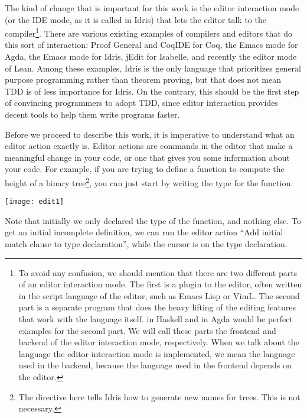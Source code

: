 The kind of change that is important for this work is the editor
interaction mode (or the IDE mode, as it is called in Idris\cite{idris}) that
lets the editor talk to the compiler\footnote{To avoid any confusion,
we should mention that there are two different parts of an editor interaction
mode. The first is a plugin to the editor, often written in the script language
of the editor, such as Emacs Lisp or VimL. The second part is a separate
program that does the heavy lifting of the editing features that work with the
language itself.   in Haskell and  in Agda would
be perfect examples for the second part. We will call these parts the frontend
and backend of the editor interaction mode, respectively.  When we talk about
the language the editor interaction mode is implemented, we mean the language
used in the backend, because the language used in the frontend depends on the
editor.}.
There are various existing examples of compilers and editors
that do this sort of interaction:
Proof General\cite{pg} and CoqIDE for Coq\cite{coq},
the Emacs mode\cite{agdamode} for Agda,
the Emacs mode\cite{idrismode} for Idris,
jEdit\cite{isabellejedit} for Isabelle,
and recently the editor mode of Lean\cite{lean}.
Among these examples, Idris is the only language that prioritizes general
purpose programming rather than theorem proving\cite{idrisfaq}, but that does
not mean TDD is of less importance for Idris. On the contrary, this should
be the first step of convincing programmers to adopt TDD, since
editor interaction provides decent tools to help them write programs faster.

Before we proceed to describe this work,
it is imperative to understand what an editor action exactly is.
Editor actions are commands in the editor that make a meaningful
change in your code, or one that gives you some information about your
code. For example, if you are trying to define a function to compute the height
of a binary tree\footnote{The \texttt{} directive here tells
Idris how to generate new names for trees. This is not necessary.}, you can
just start by writing the type for the function.

\vspace{1em}
\texttt{[image: edit1]}

Note that initially we only declared the type of the function, and nothing
else. To get an initial incomplete definition, we can run the editor action
``Add initial match clause to type declaration'', while the cursor is on the
type declaration.

